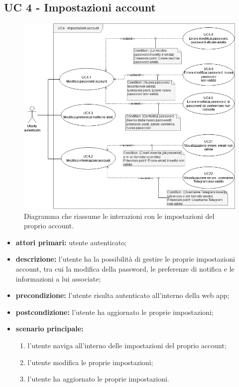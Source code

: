 	\subsection{UC 4 - Impostazioni account}

		\begin{figure}[H]
			\centering
			\includegraphics[scale=0.60]{res/images/uc4}
			\caption{Diagramma che riassume le interazioni con le impostazioni del proprio account.}
		\end{figure}

		\begin{itemize}
			\item \textbf{attori primari:} utente autenticato;
			\item \textbf{descrizione:} l'utente ha la possibilità di gestire le proprie impostazioni account, tra cui la modifica della password, le preferenze di notifica e le informazioni a lui associate;
			\item \textbf{precondizione:} l'utente risulta autenticato all'interno della web app;
			\item \textbf{postcondizione:} l'utente ha aggiornato le proprie impostazioni;
			\item \textbf{scenario principale:}
			\begin{enumerate}
				\item{l'utente naviga all'interno delle impostazioni del proprio account;}
				\item{l'utente modifica le proprie impostazioni;}
				\item{l'utente ha aggiornato le proprie impostazioni.}
			\end{enumerate}
		\end{itemize}


